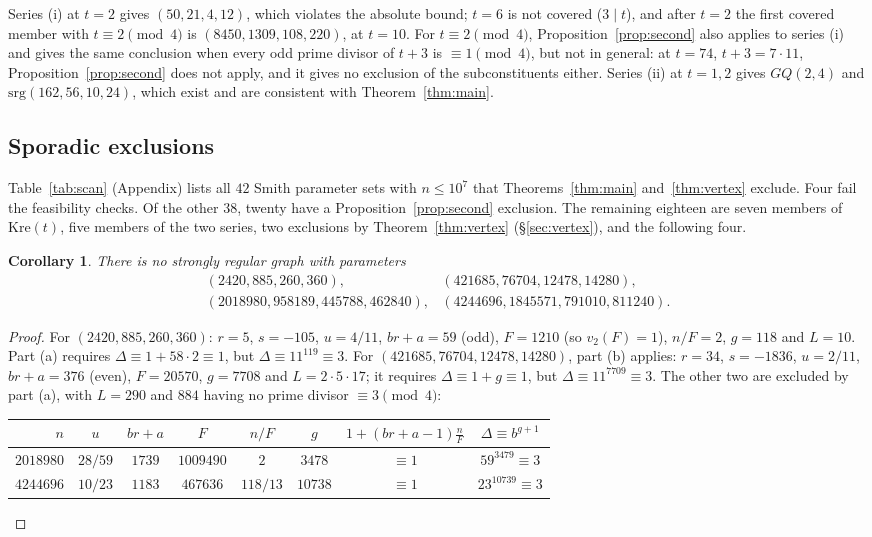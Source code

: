 \documentclass[11pt]{article}
\newtheorem{corollary}[theorem]{Corollary}
\theoremstyle{definition}
\theoremstyle{remark}
\newcommand{\Kre}{\mathrm{Kre}}
\begin{document}
Series (i) at $t=2$ gives $(50,21,4,12)$, which violates the absolute bound;
$t=6$ is not covered ($3\mid t$), and after $t=2$ the first covered member with
$t\equiv2\pmod 4$ is $(8450,1309,108,220)$, at $t=10$. For $t\equiv2\pmod4$,
Proposition~\ref{prop:second} also applies to series (i) and gives the same
conclusion when every odd prime divisor of $t+3$ is $\equiv1\pmod4$, but not in
general: at $t=74$, $t+3=7\cdot11$, Proposition~\ref{prop:second} does not
apply, and it gives no exclusion of the subconstituents either. Series (ii)
at $t=1,2$ gives $GQ(2,4)$ and $\mathrm{srg}(162,56,10,24)$, which exist and are
consistent with Theorem~\ref{thm:main}.

\subsection{Sporadic exclusions}
Table~\ref{tab:scan} (Appendix) lists all $42$ Smith parameter sets with
$n\le10^7$ that Theorems~\ref{thm:main} and~\ref{thm:vertex} exclude. Four
fail the feasibility checks. Of the other $38$, twenty have a
Proposition~\ref{prop:second} exclusion. The remaining eighteen are seven
members of $\Kre(t)$, five members of the two series, two exclusions by
Theorem~\ref{thm:vertex} (\S\ref{sec:vertex}), and the following four.

\begin{corollary}\label{cor:sporadic}
There is no strongly regular graph with parameters
\[
\begin{array}{ll}
(2420,885,260,360),& (421685,76704,12478,14280),\\
(2018980,958189,445788,462840),& (4244696,1845571,791010,811240).
\end{array}
\]
\end{corollary}

\begin{proof}
For $(2420,885,260,360)$: $r=5$, $s=-105$, $u=4/11$, $br+a=59$ (odd), $F=1210$
(so $v_2(F)=1$), $n/F=2$, $g=118$ and $L=10$. Part (a) requires
$\Delta\equiv1+58\cdot2\equiv1$, but $\Delta\equiv11^{119}\equiv3$. For
$(421685,76704,12478,14280)$, part (b) applies: $r=34$, $s=-1836$, $u=2/11$,
$br+a=376$ (even), $F=20570$, $g=7708$ and $L=2\cdot5\cdot17$; it requires
$\Delta\equiv1+g\equiv1$, but $\Delta\equiv11^{7709}\equiv3$. The other two
are excluded by part (a), with $L=290$ and $884$ having no prime divisor
$\equiv3\pmod4$:
\begin{center}\small\setlength{\tabcolsep}{4pt}
\begin{tabular}{rccccccc}\toprule
$n$&$u$&$br+a$&$F$&$n/F$&$g$&$1+(br+a-1)\frac nF$&$\Delta\equiv b^{g+1}$\\\midrule
$2018980$&$28/59$&$1739$&$1009490$&$2$&$3478$&$\equiv1$&$59^{3479}\equiv3$\\
$4244696$&$10/23$&$1183$&$467636$&$118/13$&$10738$&$\equiv1$&$23^{10739}\equiv3$\\
\bottomrule
\end{tabular}
\end{center}
\end{proof}
\end{document}
